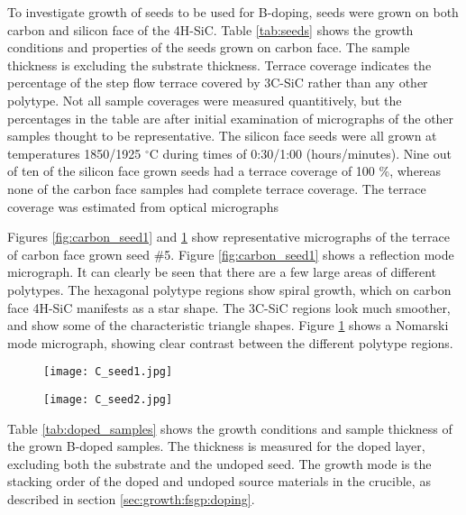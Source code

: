 To investigate growth of seeds to be used for B-doping, seeds were grown on both carbon and silicon face of the 4H-SiC. Table \ref{tab:seeds} shows the growth conditions and properties of the seeds grown on carbon face. The sample thickness is excluding the substrate thickness. Terrace coverage indicates the percentage of the step flow terrace covered by 3C-SiC rather than any other polytype. Not all sample coverages were measured quantitively, but the percentages in the table are after initial examination of micrographs of the other samples thought to be representative. The silicon face seeds were all grown at temperatures 1850/1925 $^\circ$C during times of 0:30/1:00 (hours/minutes). Nine out of ten of the silicon face grown seeds had a terrace coverage of 100 \%, whereas none of the carbon face samples had complete terrace coverage. The terrace coverage was estimated from optical micrographs

Figures \ref{fig:carbon_seed1} and \ref{fig:carbon_seed2} show representative micrographs of the terrace of carbon face grown seed \#5. Figure \ref{fig:carbon_seed1} shows a reflection mode micrograph. It can clearly be seen that there are a few large areas of different polytypes. The hexagonal polytype regions show spiral growth, which on carbon face 4H-SiC manifests as a star shape. The 3C-SiC regions look much smoother, and show some of the characteristic triangle shapes. Figure \ref{fig:carbon_seed2} shows a Nomarski mode micrograph, showing clear contrast between the different polytype regions. 

\begin{figure}[h]
\centering
\begin{minipage}{.5\textwidth}
  \centering
  \texttt{[image: C\_seed1.jpg]}
  \label{fig:carbon_seed1}
\end{minipage}%
\begin{minipage}{.5\textwidth}
  \centering
  \texttt{[image: C\_seed2.jpg]}
  \label{fig:carbon_seed2}
\end{minipage}
\end{figure}


Table \ref{tab:doped_samples} shows the growth conditions and sample thickness of the grown B-doped samples. The thickness is measured for the doped layer, excluding both the substrate and the undoped seed. The growth mode is the stacking order of the doped and undoped source materials in the crucible, as described in section \ref{sec:growth:fsgp:doping}.


